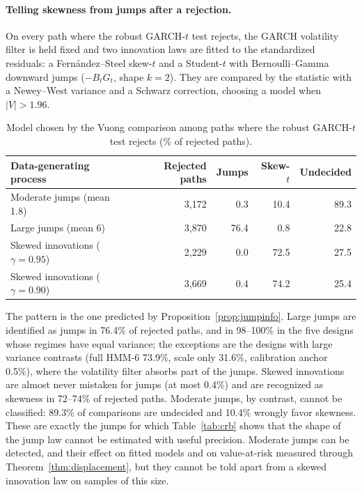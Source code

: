\documentclass[11pt,a4paper]{article}
\theoremstyle{definition}
\theoremstyle{remark}
\begin{document}
\paragraph{Telling skewness from jumps after a rejection.} On every path where the robust GARCH-$t$ test rejects, the GARCH volatility filter is held fixed and two innovation laws are fitted to the standardized residuals: a Fern\'andez--Steel skew-$t$ and a Student-$t$ with Bernoulli--Gamma downward jumps ($-B_tG_t$, shape $k=2$). They are compared by the \citet{vuong1989} statistic with a Newey--West variance and a Schwarz correction, choosing a model when $|V|>1.96$.

\begin{table}[ht]\centering\footnotesize\setlength{\tabcolsep}{4pt}
\caption{Model chosen by the Vuong comparison among paths where the robust GARCH-$t$ test rejects (\% of rejected paths).}\label{tab:vuong}
\begin{tabular}{lrrrr}
\toprule
Data-generating process & Rejected paths & Jumps & Skew-$t$ & Undecided\\
\midrule
Moderate jumps (mean 1.8) & 3{,}172 & 0.3 & 10.4 & 89.3\\
Large jumps (mean 6) & 3{,}870 & 76.4 & 0.8 & 22.8\\
Skewed innovations ($\gamma=0.95$) & 2{,}229 & 0.0 & 72.5 & 27.5\\
Skewed innovations ($\gamma=0.90$) & 3{,}669 & 0.4 & 74.2 & 25.4\\
\bottomrule
\end{tabular}
\end{table}

The pattern is the one predicted by Proposition~\ref{prop:jumpinfo}. Large jumps are identified as jumps in 76.4\% of rejected paths, and in 98--100\% in the five designs whose regimes have equal variance; the exceptions are the designs with large variance contrasts (full HMM-6 73.9\%, scale only 31.6\%, calibration anchor 0.5\%), where the volatility filter absorbs part of the jumps. Skewed innovations are almost never mistaken for jumps (at most 0.4\%) and are recognized as skewness in 72--74\% of rejected paths. Moderate jumps, by contrast, cannot be classified: 89.3\% of comparisons are undecided and 10.4\% wrongly favor skewness. These are exactly the jumps for which Table~\ref{tab:crb} shows that the shape of the jump law cannot be estimated with useful precision. Moderate jumps can be detected, and their effect on fitted models and on value-at-risk measured through Theorem~\ref{thm:displacement}, but they cannot be told apart from a skewed innovation law on samples of this size.
\end{document}
